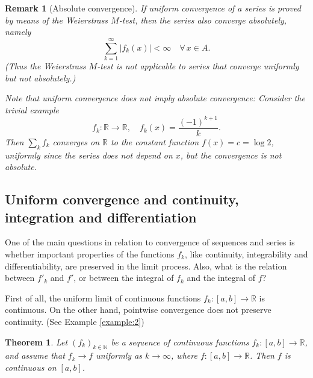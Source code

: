 \documentclass[a4paper,reqno]{amsart}
\numberwithin{equation}{section}
\newtheorem{theorem}[definition]{Theorem}
\newtheorem{remark}[definition]{Remark}
\def\R{\mathbb{R}}
\begin{document}
\begin{remark}[Absolute convergence]
If uniform convergence of a series is proved by means of the Weierstrass $M$-test, then the series also converge absolutely, namely
$$
\sum_{k=1}^\infty |f_k(x)| <\infty \quad \forall \, x\in A.
$$
(Thus the Weierstrass $M$-test is not applicable to series that converge uniformly but not absolutely.)

Note that uniform convergence does not imply absolute convergence: Consider the trivial example
$$
f_k:\R\to \R, \quad f_k(x) = \frac{(-1)^{k+1}}{k}.
$$
Then $\sum_k f_k$ converges on $\R$ to the constant function $f(x)=c=\log 2$, uniformly since the series does not depend on $x$, but the convergence is not absolute.
\end{remark}


\subsection{Uniform convergence and continuity, integration and differentiation}

One of the main questions in relation to convergence of sequences and series is whether important properties of the functions $f_k$, like continuity, integrability and differentiability, are preserved in the limit process. Also, what is the relation between $f'_k$ and $f'$, or between the integral of $f_k$ and the integral of $f$?
\medskip

First of all, the uniform limit of continuous functions $f_k:[a,b]\to \R$ is continuous. On the other hand, pointwise convergence does not preserve continuity. (See Example \ref{example:2})


\begin{theorem}\label{unif:cont}
Let $(f_k)_{k\in \mathbb{N}}$ be a sequence of continuous functions $f_k:[a,b]\to \R$, and assume that $f_k\to f$ uniformly as $k \to \infty$, where $f: [a,b]\to \R$. Then $f$ is  continuous on $[a,b]$.
\end{theorem}
\end{document}
